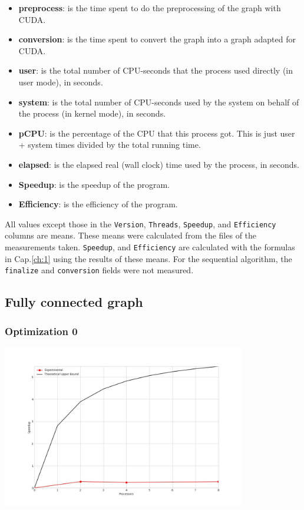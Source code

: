 \begin{itemize}
    \item \textbf{preprocess}: is the time spent to do the preprocessing of the graph with CUDA.
    \item \textbf{conversion}: is the time spent to convert the graph into a graph adapted for CUDA.
    \item \textbf{user}: is the total number of CPU-seconds that the process used directly (in user mode), in seconds.
    \item \textbf{system}: is the total number of CPU-seconds used by the system on behalf of the process (in kernel mode), in seconds.
    \item \textbf{pCPU}: is the percentage of the CPU that this process got. This is just user + system times divided by the total running time.
    \item \textbf{elapsed}: is the elapsed real (wall clock) time used by the process, in seconds.
    \item \textbf{Speedup}: is the speedup of the program.
    \item \textbf{Efficiency}: is the efficiency of the program. 
\end{itemize}
All values except those in the \verb|Version|, \verb|Threads|, \verb|Speedup|, and \verb|Efficiency| columns are means. These means were calculated from the files of the measurements taken.
\verb|Speedup|, and \verb|Efficiency| are calculated with the formulas in Cap.\ref{ch:1} using the results of these means.
For the sequential algorithm, the \verb|finalize| and \verb|conversion| fields were not measured. 

\clearpage
\subsection{Fully connected graph}
\subsubsection{Optimization 0}
\begin{center}
    \resizebox{0.95\textwidth}{!}{}
    \includegraphics[width=0.8\textwidth]{../img/speedup-graph_type-fully-connected-12500-O0}
\end{center}

